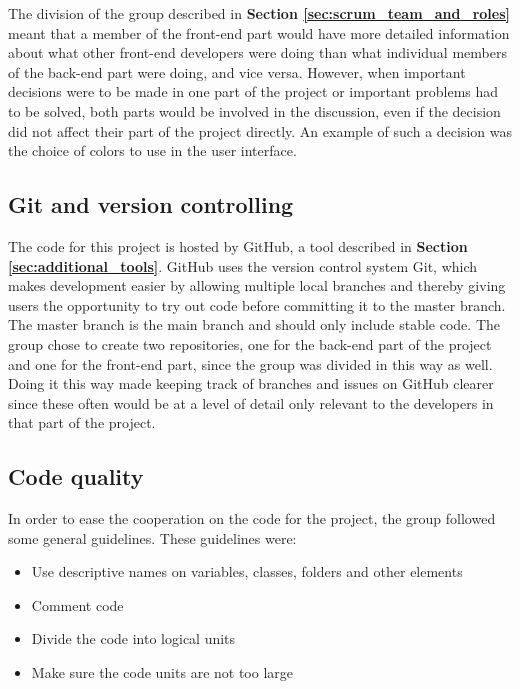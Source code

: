 The division of the group described in \textbf{Section \ref{sec:scrum_team_and_roles}} meant that a member of the front-end part would have more detailed information about what other front-end developers were doing than what individual members of the back-end part were doing, and vice versa. However, when important decisions were to be made in one part of the project or important problems had to be solved, both parts would be involved in the discussion, even if the decision did not affect their part of the project directly. An example of such a decision was the choice of colors to use in the user interface.

\subsection{Git and version controlling}

The code for this project is hosted by GitHub, a tool described in \textbf{Section \ref{sec:additional_tools}}. GitHub uses the version control system Git, which makes development easier by allowing multiple local branches and thereby giving users the opportunity to try out code before committing it to the master branch. The master branch is the main branch and should only include stable code. The group chose to create two repositories, one for the back-end part of the project and one for the front-end part, since the group was divided in this way as well. Doing it this way made keeping track of branches and issues on GitHub clearer since these often would be at a level of detail only relevant to the developers in that part of the project. 

\subsection{Code quality}

In order to ease the cooperation on the code for the project, the group followed some general guidelines. These guidelines were:
\begin{itemize}
	\item Use descriptive names on variables, classes, folders and other elements
	\item Comment code
	\item Divide the code into logical units 
	\item Make sure the code units are not too large
\end{itemize}

